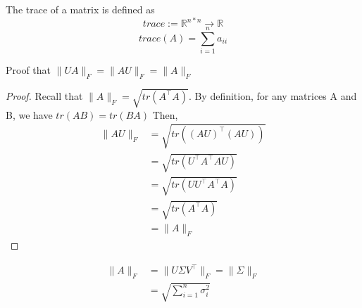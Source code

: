 \begin{definition}[trace]
	The trace of a matrix is defined as
	\[
	trace := \mathbb{R}^{n*n} \rightarrow \mathbb{R}
	\]
	\[
trace(A) = \sum_{i=1}^na_{ii}
	\]
\end{definition}

\begin{remark}
	Proof that $\|UA\|_F = \|AU\|_F = \|A\|_F$
	\begin{proof}
		Recall that $\|A\|_F = \sqrt{tr(A^\top A)}$. By definition, for any matrices A and B, we have $tr(AB)=tr(BA)$ Then,
		\begin{align*}
			\|AU\|_F &= \sqrt{tr((AU)^\top(AU))}\\
			&= \sqrt{tr(U^\top A^\top AU)}\\
			&= \sqrt{tr(UU^\top A^\top A)}\\
			&= \sqrt{tr(A^\top A)}\\
			&= \|A\|_F
		\end{align*}
	\end{proof}
\end{remark}

\begin{remark}
\begin{align*}
	\|A\|_F &= \|U \Sigma V^\top\|_F = \|\Sigma\|_F\\
	&=\sqrt{\sum_{i=1}^n \sigma_i^2}
\end{align*}
\end{remark}



